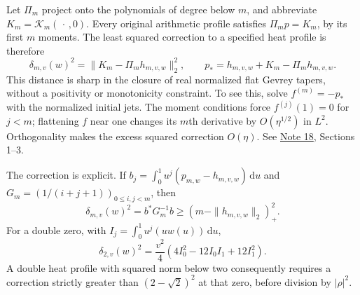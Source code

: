 \documentclass[11pt]{article}
\newcommand{\dd}{\,\mathrm d}
\newcommand{\CTref}{\href{../notes/18_ARITHMETIC_HEAT_TRANSFER_AND_EXACT_COMPLETION_20261021.md}{Note 18}}
\begin{document}
Let \(\Pi_m\) project onto the polynomials of degree below \(m\),
and abbreviate \(K_m=\mathcal K_m(\,\cdot\,,0)\). Every original
arithmetic profile satisfies \(\Pi_m p=K_m\), by its first \(m\)
moments. The least squared correction to a specified heat profile is
therefore
\begin{equation}\label{eq:repair}
 \delta_{m,v}(w)^2=\|K_m-\Pi_m h_{m,v,w}\|_2^2,\qquad
 p_*=h_{m,v,w}+K_m-\Pi_m h_{m,v,w}.
\end{equation}
This distance is sharp in the closure of real normalized flat Gevrey
tapers, without a positivity or monotonicity constraint. To see this,
solve \(f^{(m)}=-p_*\) with the normalized initial jets. The moment
conditions force \(f^{(j)}(1)=0\) for \(j<m\); flattening \(f\)
near one changes its \(m\)th derivative by \(O(\eta^{1/2})\)
in \(L^2\). Orthogonality makes the excess squared correction
\(O(\eta)\). See \CTref, Sections 1--3.

The correction is explicit. If
\(b_j=\int_0^1u^j(p_{m,w}-h_{m,v,w})\dd u\) and
\(G_m=(1/(i+j+1))_{0\le i,j<m}\), then
\[
 \delta_{m,v}(w)^2=b^*G_m^{-1}b
       \ge (m-\|h_{m,v,w}\|_2)_+^2.
\]
For a double zero, with \(I_j=\int_0^1u^j(uw(u))\dd u\),
\begin{equation}\label{eq:double-repair}
 \delta_{2,v}(w)^2=\frac{v^2}{4}
                 (4I_0^2-12I_0I_1+12I_1^2).
\end{equation}
A double heat profile with squared norm below two consequently requires
a correction strictly greater than \((2-\sqrt2)^2\) at that zero,
before division by \(|\rho|^2\).
\end{document}

